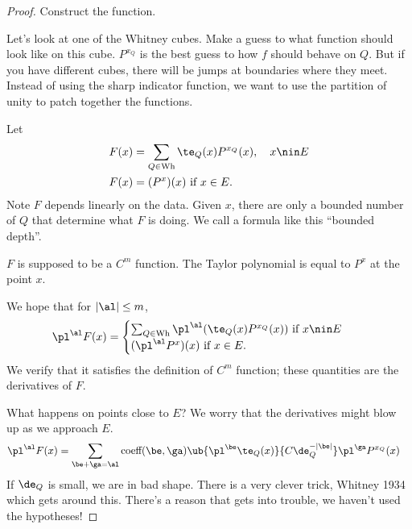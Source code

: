 \begin{proof}
 Construct the function.

Let's look at one of the Whitney cubes. Make a guess to what function should look like on this cube. $P^{x_Q}$ is the best guess to how $f$ should behave on $Q$. 
But if you have different cubes, there will be jumps at boundaries where they meet. Instead of using the sharp indicator function, we want to use the partition of unity to patch together the functions.

Let
\begin{align}
F(x) &= \sum_{Q\in \text{Wh}} \te_Q(x) P^{x_Q}(x), \quad x\nin E\\
F(x) &= (P^x)(x) \text{ if } x\in E.
\end{align} 
Note $F$ depends linearly on the data. Given $x$, there are only a bounded number of $Q$ that determine what $F$ is doing. We call a formula like this ``bounded depth''. 

$F$ is supposed to be a $C^m$ function. The Taylor polynomial is equal to $P^x$ at the point $x$. 

We hope that for $|\al|\le m$, 
\begin{align}
\pl^\al F(x) &= \begin{cases}
\sum_{Q\in \text{Wh}} \pl^\al (\te_Q(x) P^{x_Q}(x)) \text{ if }x\nin E\\
(\pl^\al P^x)(x) \text{ if }x\in E.
\end{cases}
\end{align}
We verify that it satisfies the definition of $C^m$ function; these quantities are the derivatives of $F$. 

What happens on points close to $E$? We worry that the derivatives might blow up as we approach $E$. 
\begin{align}
\pl^\al F(x) &= \sum_{\be + \ga = \al}
\text{coeff}(\be,\ga) \ub{\pl^\be \te_Q(x)}{C\de_Q^{-|\be|}} \pl^\ga P^{x_Q}(x) 
\end{align}
If $\de_Q$ is small, we are in bad shape. There is a very clever trick, Whitney 1934 which gets around this. 
There's a reason that gets into trouble, we haven't used the hypotheses!


\end{proof}
